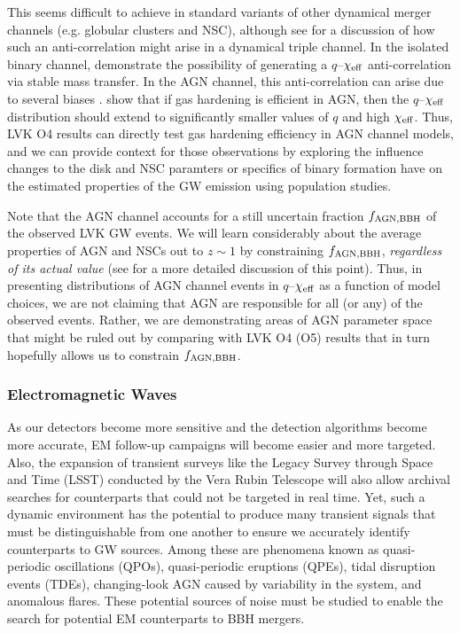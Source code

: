 This seems difficult to achieve in standard variants of other dynamical merger channels (e.g. globular clusters and NSC), although see \citet{Su25} for a discussion of how such an anti-correlation might arise in a dynamical triple channel.
In the isolated binary channel, \citep[e.g.][]{Olejak+24,BanerjeeOlejak24} demonstrate the possibility of generating a $q$--$\chi_{\rm eff}$ anti-correlation via stable mass transfer.
In the AGN channel, this anti-correlation can arise due to several biases \citep{McKernan+22:q-Xeff,Santini+23, DittmannDempseyLi24}.
\citet{Vaccaro+24} show that if gas hardening is efficient in AGN, then the $q$--$\chi_{\rm eff}$ distribution should extend to significantly smaller values of $q$ and high $\chi_{\rm eff}$.
Thus, LVK O4 results can directly test gas hardening efficiency in AGN channel models, and we can provide context for those observations by exploring the influence changes to the disk and NSC paramters or specifics of binary formation have on the estimated properties of the GW emission using population studies.

Note that the AGN channel accounts for a still uncertain fraction $f_{\rm AGN,BBH}$ of the observed LVK GW events.
We will learn considerably about the average properties of AGN and NSCs out to $z \sim 1$ by constraining $f_{\rm AGN, BBH}$, \emph{regardless of its actual value} (see \citealt{FordMcKernan25} for a more detailed discussion of this point).
Thus, in presenting distributions of AGN channel events in $q$--$\chi_{\rm eff}$ as a function of model choices, we are not claiming that AGN are responsible for all (or any) of the observed events.
Rather, we are demonstrating areas of AGN parameter space that might be ruled out by comparing with LVK O4 (O5) results that in turn hopefully allows us to constrain $f_{\rm AGN,BBH}$.




\subsubsection{Electromagnetic Waves}

As our detectors become more sensitive and the detection algorithms become more accurate, EM follow-up campaigns will become easier and more targeted.
Also, the expansion of transient surveys like the Legacy Survey through Space and Time (LSST) conducted by the Vera Rubin Telescope will also allow archival searches for counterparts that could not be targeted in real time.
Yet, such a dynamic environment has the potential to produce many transient signals that must be distinguishable from one another to ensure we accurately identify counterparts to GW sources.
Among these are phenomena known as quasi-periodic oscillations (QPOs), quasi-periodic eruptions (QPEs), tidal disruption events (TDEs), changing-look AGN caused by variability in the system, and anomalous flares.
These potential sources of noise must be studied to enable the search for potential EM counterparts to BBH mergers.

